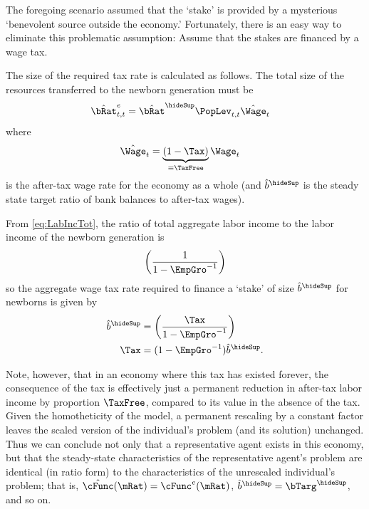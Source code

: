 \documentclass{\handout}
\begin{document}
The foregoing scenario assumed that the `stake' is provided by a mysterious
`benevolent source outside the economy.'  Fortunately, there is an
easy way to eliminate this problematic assumption: Assume that the
stakes are financed by a wage tax.

The size of the required tax rate is calculated as follows.  The total size
of the resources transferred to the newborn generation must be
\begin{equation}\begin{gathered}\begin{aligned}
  \hat{\bRat}^{e}_{t,t} & =  \hat{\bRat}^{\hideSup} \PopLev_{t,t} \hat{\Wage}_{t}
\end{aligned}\end{gathered}\end{equation}
where
\begin{equation}\begin{gathered}\begin{aligned}
  \hat{\Wage}_{t} & =  \underbrace{\left(1-\Tax \right)}_{\equiv \TaxFree}\Wage_{t}
\end{aligned}\end{gathered}\end{equation}
is the after-tax wage rate for the economy as a whole (and $\hat{b}^{\hideSup}$ is the steady state target ratio of bank balances to after-tax wages).

From \eqref{eq:LabIncTot}, the ratio of total aggregate labor income 
to the labor income of the newborn generation is 
\begin{equation}\begin{gathered}\begin{aligned}
  \left(\frac{1}{1-\EmpGro^{-1}}\right)
\end{aligned}\end{gathered}\end{equation}
so the aggregate wage tax rate required to finance a `stake' of size $\hat{b}^{\hideSup}$ for
newborns is given by 
\begin{equation}\begin{gathered}\begin{aligned}
  \hat{b}^{\hideSup} & =    \left(\frac{\Tax}{1-\EmpGro^{-1}}\right)
\\ \Tax & =  (1-\EmpGro^{-1})\hat{b}^{\hideSup}
.
\end{aligned}\end{gathered}\end{equation}

Note, however, that in an economy where this tax has existed forever, the consequence
of the tax is effectively just a permanent reduction in after-tax labor income by proportion $\TaxFree$, compared to its value in the absence of the tax.  
Given the homotheticity of the model, a permanent rescaling by a constant 
factor leaves the scaled version of the individual's problem (and its solution)
unchanged.  Thus we can conclude not only that a representative agent exists
in this economy, but that the steady-state characteristics of the 
representative agent's problem are identical (in ratio form) to the 
characteristics of the unrescaled individual's problem; that is, 
$\hat{\cFunc}(\mRat) = \cFunc^{e}(\mRat)$, $\hat{b}^{\hideSup} = \bTarg^{\hideSup}$, and so on.  
\end{document}

